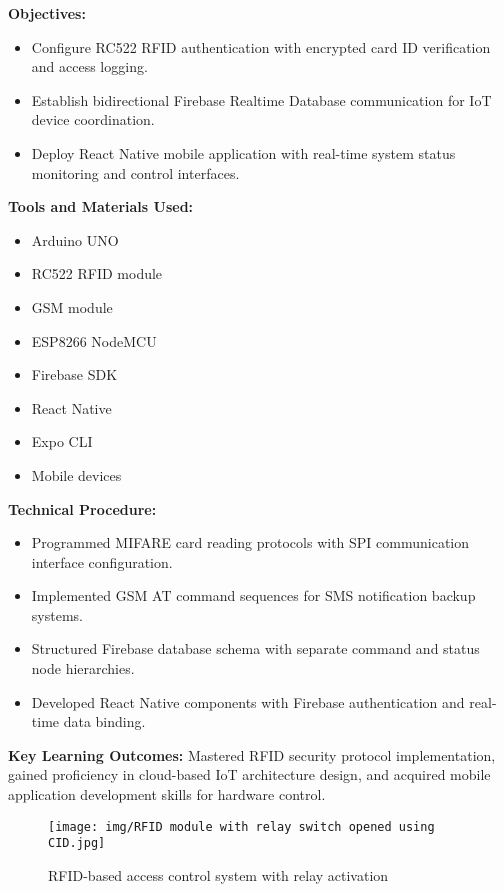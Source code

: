 \documentclass[12pt,a4paper]{report}
\begin{document}
\noindent\textbf{Objectives:}
\begin{itemize}
    \item Configure RC522 RFID authentication with encrypted card ID verification and access logging.
    \item Establish bidirectional Firebase Realtime Database communication for IoT device coordination.
    \item Deploy React Native mobile application with real-time system status monitoring and control interfaces.
\end{itemize}

\noindent\textbf{Tools and Materials Used:}
\begin{multicols}{2}
\begin{itemize}
    \item Arduino UNO
    \item RC522 RFID module
    \item GSM module
    \item ESP8266 NodeMCU
    \item Firebase SDK
    \item React Native
    \item Expo CLI
    \item Mobile devices
\end{itemize}
\end{multicols}

\noindent\textbf{Technical Procedure:}
\begin{itemize}
    \item Programmed MIFARE card reading protocols with SPI communication interface configuration.
    \item Implemented GSM AT command sequences for SMS notification backup systems.
    \item Structured Firebase database schema with separate command and status node hierarchies.
    \item Developed React Native components with Firebase authentication and real-time data binding.
\end{itemize}

\noindent\textbf{Key Learning Outcomes:} Mastered RFID security protocol implementation, gained proficiency in cloud-based IoT architecture design, and acquired mobile application development skills for hardware control.

\begin{figure}[H]
\centering
\texttt{[image: img/RFID module with relay switch opened using CID.jpg]}
\caption{RFID-based access control system with relay activation}
\label{fig:rfid-system}
\end{figure}
\end{document}
